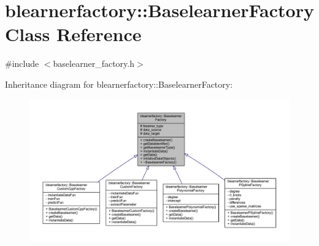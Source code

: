 \hypertarget{classblearnerfactory_1_1_baselearner_factory}{}\section{blearnerfactory\+:\+:Baselearner\+Factory Class Reference}
\label{classblearnerfactory_1_1_baselearner_factory}


{\ttfamily \#include $<$baselearner\+\_\+factory.\+h$>$}



Inheritance diagram for blearnerfactory\+:\+:Baselearner\+Factory\+:\nopagebreak
\begin{figure}[H]
\begin{center}
\leavevmode
\includegraphics[width=350pt]{classblearnerfactory_1_1_baselearner_factory__inherit__graph}
\end{center}
\end{figure}


